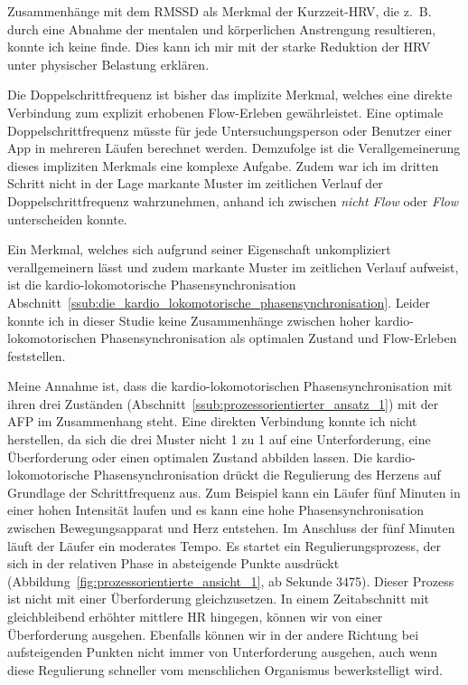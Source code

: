 Zusammenhänge mit dem \acs{RMSSD} als Merkmal der Kurzzeit-\ac{HRV}, die z.~B. durch eine Abnahme der mentalen und körperlichen Anstrengung resultieren, konnte ich keine finde. Dies kann ich mir mit der starke Reduktion der \ac{HRV} unter physischer Belastung erklären.

Die Doppelschrittfrequenz ist bisher das implizite Merkmal, welches eine direkte Verbindung zum explizit erhobenen Flow-Erleben gewährleistet. Eine optimale Doppelschrittfrequenz müsste für jede Untersuchungsperson oder Benutzer einer App in mehreren Läufen berechnet werden. Demzufolge ist die Verallgemeinerung dieses impliziten Merkmals eine komplexe Aufgabe. Zudem war ich im dritten Schritt nicht in der Lage markante Muster im zeitlichen Verlauf der Doppelschrittfrequenz wahrzunehmen, anhand ich zwischen \emph{nicht Flow} oder \emph{Flow} unterscheiden konnte.

Ein Merkmal, welches sich aufgrund seiner Eigenschaft unkompliziert verallgemeinern lässt und zudem markante Muster im zeitlichen Verlauf aufweist, ist die kardio-lokomotorische Phasensynchronisation Abschnitt~\ref{ssub:die_kardio_lokomotorische_phasensynchronisation}. Leider konnte ich in dieser Studie keine Zusammenhänge zwischen hoher kardio-lokomotorischen Phasensynchronisation als optimalen Zustand und Flow-Erleben feststellen. 

Meine Annahme ist, dass die kardio-lokomotorischen Phasensynchronisation mit ihren drei Zuständen (Abschnitt~\ref{ssub:prozessorientierter_ansatz_1}) mit der \ac{AFP} im Zusammenhang steht. Eine direkten Verbindung konnte ich nicht herstellen, da sich die drei Muster nicht 1 zu 1 auf eine Unterforderung, eine Überforderung oder einen optimalen Zustand abbilden lassen. Die kardio-lokomotorische Phasensynchronisation drückt die Regulierung des Herzens auf Grundlage der Schrittfrequenz aus. Zum Beispiel kann ein Läufer fünf Minuten in einer hohen Intensität laufen und es kann eine hohe Phasensynchronisation zwischen Bewegungsapparat und Herz entstehen. Im Anschluss der fünf Minuten läuft der Läufer ein moderates Tempo. Es startet ein Regulierungsprozess, der sich in der relativen Phase in absteigende Punkte ausdrückt (Abbildung~\ref{fig:prozessorientierte_ansicht_1}, ab Sekunde 3475). Dieser Prozess ist nicht mit einer Überforderung gleichzusetzen. In einem Zeitabschnitt mit gleichbleibend erhöhter mittlere \ac{HR} hingegen, können wir von einer Überforderung ausgehen. Ebenfalls können wir in der andere Richtung bei aufsteigenden Punkten nicht immer von Unterforderung ausgehen, auch wenn diese Regulierung schneller vom menschlichen Organismus bewerkstelligt wird.

